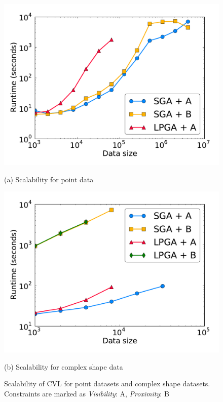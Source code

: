 \documentclass[11pt, oneside]{report}
\begin{document}
{\begin{figure}[tb]
  \begin{minipage}{0.49\linewidth}
    \centerline{\includegraphics[width=1.0\linewidth]{./figs-cvl/scal_pnt_30m_synthetic.pdf}}
    \centerline{(a) Scalability for point data}
  \end{minipage} \hfill
  \begin{minipage}{0.49\linewidth}
    \centerline{\includegraphics[width=1.0\linewidth]{./figs-cvl/scal_lin_30k_uswaterway.pdf}}
    \centerline{(b) Scalability for complex shape data}
  \end{minipage} \hfill
  \caption{Scalability of CVL for point datasets and complex shape datasets. Constraints are marked as \emph{Visibility}: A, \emph{Proximity}: B} \label{fig:cvl:scalability}
\end{figure}

}
\end{document}

